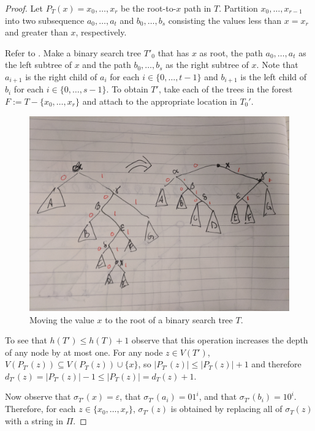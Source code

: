 \documentclass[kpfonts]{patmorin}
\begin{document}
\begin{proof}
Let $P_T(x)=x_0,\ldots,x_r$ be the root-to-$x$ path in $T$.  Partition $x_0,\ldots,x_{r-1}$ into two subsequence $a_0,\ldots,a_t$ and $b_0,\ldots,b_s$ consisting the values less than $x=x_r$ and greater than $x$, respectively.  

Refer to . Make a binary search tree $T'_0$ that has $x$ as root, the path $a_0,\ldots,a_t$ as the left subtree of $x$ and the path $b_0,\ldots,b_s$ as the right subtree of $x$.  Note that $a_{i+1}$ is the right child of $a_i$ for each $i\in\{0,\ldots,t-1\}$ and $b_{i+1}$ is the left child of $b_i$ for each $i\in\{0,\ldots,s-1\}$. To obtain $T'$, take each of the trees in the forest $F:=T-\{x_0,\ldots,x_r\}$ and attach to the appropriate location in $T_0'$.

\begin{figure}
  \begin{center}
    \includegraphics[width=.8\textwidth]{images/split}
  \end{center}
  \caption{Moving the value $x$ to the root of a binary search tree $T$.}
\end{figure}

To see that $h(T')\le h(T)+1$ observe that this operation increases the depth of any node by at most one.  For any node $z\in V(T')$, $V(P_{T'}(z))\subseteq V(P_T(z))\cup\{x\}$, so $|P_{T'}(z)|\le |P_T(z)|+1$ and therefore $d_{T'}(z) = |P_{T'}(z)|-1 \le |P_{T}(z)| = d_T(z)+1$. 

Now observe that $\sigma_{T'}(x)=\varepsilon$, that $\sigma_{T'}(a_i)=01^i$, and that $\sigma_{T'}(b_i)=10^i$.  Therefore, for each $z\in\{x_0,\ldots,x_r\}$, $\sigma_{T'}(z)$ is obtained by replacing all of $\sigma_T(z)$ with a string in $\Pi$.


\end{proof}
\end{document}
